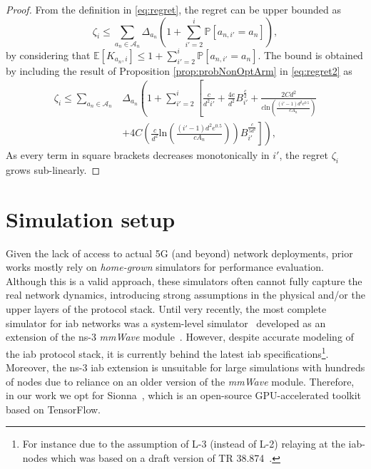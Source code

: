 \begin{proof}
From the definition in \eqref{eq:regret}, the regret can be upper bounded as 
\begin{equation}
\zeta_i \leq \sum_{a_n\in\mathcal{A}_n}{\Delta_{a_n} \left(1+\sum_{i'=2}^i\mathbb{P}[a_{n,i'}=a_n]\right)} \label{eq:regret2},
\end{equation}
by considering that $\mathbb{E}[K_{a_n,i}]\leq 1+\sum_{i'=2}^i\mathbb{P}[a_{n,i'}=a_n]$. 
The bound is obtained by including the result of Proposition \ref{prop:probNonOptArm} in \eqref{eq:regret2} as
\begin{align}
    \zeta_i \leq \!\!\sum_{a_n\in \mathcal{A}_n} & \!\! \Delta_{a_n}\!\! \left(1+\sum_{i'=2}^i\left[ \frac{c}{d^2i'} + \frac{4e}{d^2}B_{i'}^{\frac{c}{2}}  + \frac{2Cd^2}{c \mathrm{ln}\left(\frac{(i'-1)d^2e^{0.5}}{cA_n}\right)}
    \right.\right. \nonumber \\
    &+ \left.\left. 4C\left(\frac{c}{d^2}\mathrm{ln}\left(\frac{(i'-1)d^2e^{0.5}}{c A_n}\right)\right) B_{i'}^{\frac{c}{5d^2}}  \right]\right),
\end{align}
As every term in square brackets decreases monotonically in $i'$, the regret $\zeta_i$ grows sub-linearly.

\end{proof}  \section{Simulation setup}
\label{s:simulation_setup}
Given the lack of access to actual 5G (and beyond) network deployments, prior works mostly rely on \textit{home-grown} simulators for performance evaluation. Although this is a valid approach, these simulators often cannot fully capture the real network dynamics, introducing strong assumptions in the physical and/or the upper layers of the protocol stack. 
Until very recently, the most complete  simulator for \gls{iab} networks was a system-level simulator~\cite{8514996} developed as an extension of the ns-3 \textit{mmWave} module~\cite{8344116}. However, despite accurate modeling of the \gls{iab} protocol stack, it is currently behind the latest \gls{iab} specifications\footnote{For instance due to the assumption of L-3 (instead of L-2) relaying at the \gls{iab}-nodes which was based on a draft version of TR 38.874~\cite{3gpp_38_874_old}.}. Moreover, the ns-3 \gls{iab} extension is unsuitable for large simulations with hundreds of nodes due to reliance on an older version of the \textit{mmWave} module. Therefore, in our work we opt for Sionna~\cite{hoydis2022sionna}, which is an open-source GPU-accelerated toolkit based on TensorFlow. 

